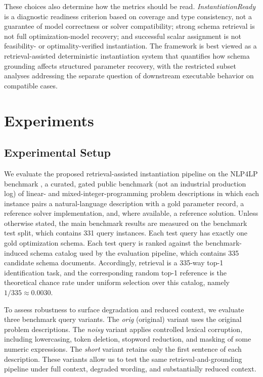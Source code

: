 \documentclass[pdflatex,sn-basic,Numbered]{sn-jnl}
\begin{document}
These choices also determine how the metrics should be read. \textit{InstantiationReady} is a diagnostic readiness criterion based on coverage and type consistency, not a guarantee of model correctness or solver compatibility; strong schema retrieval is not full optimization-model recovery; and successful scalar assignment is not feasibility- or optimality-verified instantiation. The framework is best viewed as a retrieval-assisted deterministic instantiation system that quantifies how schema grounding affects structured parameter recovery, with the restricted subset analyses addressing the separate question of downstream executable behavior on compatible cases.

\section{Experiments}
\label{sec:experiments}

\subsection{Experimental Setup}
\label{subsec:exp_setup}

We evaluate the proposed retrieval-assisted instantiation pipeline on the \textsc{NLP4LP} benchmark \cite{nlp4lp_dataset,ahmaditeshnizi2024optimus_icml}, a curated, gated public benchmark (not an industrial production log) of linear- and mixed-integer-programming problem descriptions in which each instance pairs a natural-language description with a gold parameter record, a reference solver implementation, and, where available, a reference solution. Unless otherwise stated, the main benchmark results are measured on the benchmark test split, which contains 331 query instances. Each test query has exactly one gold optimization schema. Each test query is ranked against the benchmark-induced schema catalog used by the evaluation pipeline, which contains 335 candidate schema documents. Accordingly, retrieval is a 335-way top-1 identification task, and the corresponding random top-1 reference is the theoretical chance rate under uniform selection over this catalog, namely $1/335 \approx 0.0030$.

To assess robustness to surface degradation and reduced context, we evaluate three benchmark query variants. The \emph{orig} (original) variant uses the original problem descriptions. The \emph{noisy} variant applies controlled lexical corruption, including lowercasing, token deletion, stopword reduction, and masking of some numeric expressions. The \emph{short} variant retains only the first sentence of each description. These variants allow us to test the same retrieval-and-grounding pipeline under full context, degraded wording, and substantially reduced context.
\end{document}

